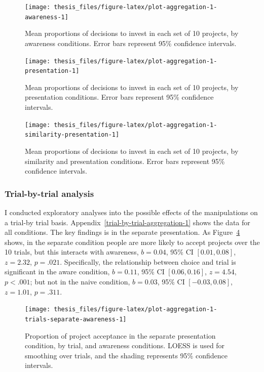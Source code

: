 \documentclass[a4paper, nobind, dvipsnames]{templates/ociamthesis}
\theoremstyle{definition}
\theoremstyle{definition}
\theoremstyle{definition}
\theoremstyle{definition}
\theoremstyle{remark}
\begin{document}
\begin{figure}
\texttt{[image: thesis\_files/figure-latex/plot-aggregation-1-awareness-1]} \caption{Mean proportions of decisions to invest in each set of 10 projects, by awareness conditions. Error bars represent 95\% confidence intervals.}\label{fig:plot-aggregation-1-awareness}
\end{figure}



\begin{figure}
\texttt{[image: thesis\_files/figure-latex/plot-aggregation-1-presentation-1]} \caption{Mean proportions of decisions to invest in each set of 10 projects, by presentation conditions. Error bars represent 95\% confidence intervals.}\label{fig:plot-aggregation-1-presentation}
\end{figure}



\begin{figure}
\texttt{[image: thesis\_files/figure-latex/plot-aggregation-1-similarity-presentation-1]} \caption{Mean proportions of decisions to invest in each set of 10 projects, by similarity and presentation conditions. Error bars represent 95\% confidence intervals.}\label{fig:plot-aggregation-1-similarity-presentation}
\end{figure}

\subsubsection{Trial-by-trial analysis}

I conducted exploratory analyses into the possible effects of the manipulations
on a trial-by trial basis. Appendix~\ref{trial-by-trial-aggregation-1} shows
the data for all conditions. The key findings is in the separate presentation.
As Figure~\ref{fig:plot-aggregation-1-trials-separate-awareness} shows, in the
separate condition people are more likely to accept projects over the 10 trials,
but this interacts with awareness,
\(b = 0.04\), 95\% CI \([0.01, 0.08]\), \(z = 2.32\), \(p = .021\).
Specifically, the relationship between choice and trial is significant in the
aware condition,
\(b = 0.11\), 95\% CI \([0.06, 0.16]\), \(z = 4.54\), \(p < .001\); but not in the
naive condition,
\(b = 0.03\), 95\% CI \([-0.03, 0.08]\), \(z = 1.01\), \(p = .311\).



\begin{figure}
\texttt{[image: thesis\_files/figure-latex/plot-aggregation-1-trials-separate-awareness-1]} \caption{Proportion of project acceptance in the separate presentation condition, by trial, and awareness conditions. LOESS is used for smoothing over trials, and the shading represents 95\% confidence intervals.}\label{fig:plot-aggregation-1-trials-separate-awareness}
\end{figure}
\end{document}
